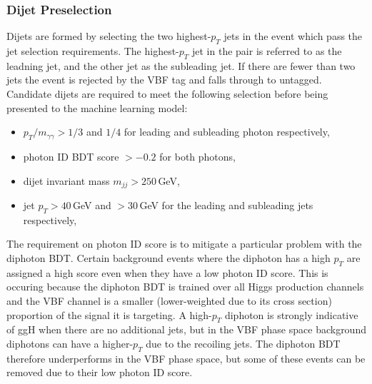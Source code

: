 






\subsubsection{Dijet Preselection}
Dijets are formed by selecting the two highest-$p_T$ jets in the event which pass the jet selection requirements. The highest-$p_T$ jet in the pair is referred to as the leadning jet, and the other jet as the subleading jet. If there are fewer than two jets the event is rejected by the VBF tag and falls through to untagged. 
Candidate dijets are required to meet the following selection before being presented to the machine learning model:
\begin{itemize}[leftmargin=.5in,noitemsep]
    \item $p_{T}/m_{\gamma\gamma} > 1/3$ and $1/4$ for leading and subleading photon respectively,
    \item photon ID BDT score $> -0.2$ for both photons,
    \item dijet invariant mass $m_{jj} > 250$\,GeV,
    \item jet $p_{T} > 40$\,GeV and $> 30$\,GeV for the leading and subleading jets respectively,
\end{itemize}

The requirement on photon ID score is to mitigate a particular problem with the diphoton BDT. Certain background events where the diphoton has a high $p_T$ are assigned a high score even when they have a low photon ID score. This is occuring because the diphoton BDT is trained over all Higgs production channels and the VBF channel is a smaller (lower-weighted due to its cross section) proportion of the signal it is targeting. A high-$p_T$ diphoton is strongly indicative of ggH when there are no additional jets, but in the VBF phase space background diphotons can have a higher-$p_T$ due to the recoiling jets. The diphoton BDT therefore underperforms in the VBF phase space, but some of these events can be removed due to their low photon ID score. 









